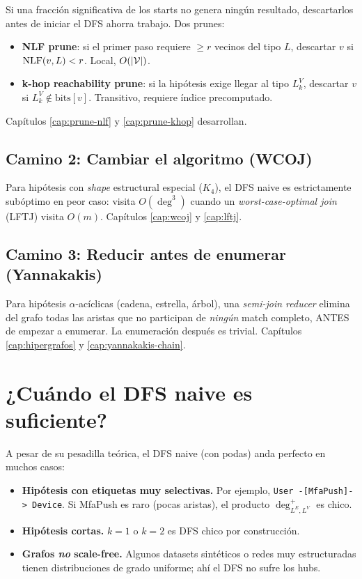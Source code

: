 Si una fracción significativa de los starts no genera ningún
resultado, descartarlos antes de iniciar el DFS ahorra trabajo.
Dos prunes:

\begin{itemize}
    \item \textbf{NLF prune}: si el primer paso requiere
    \(\geq r\) vecinos del tipo \(L\), descartar \(v\) si
    \(\mathrm{NLF}(v, L) < r\). Local, \(O(|\mathcal{V}|)\).
    \item \textbf{k-hop reachability prune}: si la hipótesis exige
    llegar al tipo \(L_k^V\), descartar \(v\) si \(L_k^V \notin
    \mathrm{bits}[v]\). Transitivo, requiere índice precomputado.
\end{itemize}

Capítulos \ref{cap:prune-nlf} y \ref{cap:prune-khop} desarrollan.

\subsection{Camino 2: Cambiar el algoritmo (WCOJ)}

Para hipótesis con \emph{shape} estructural especial (\(K_4\)), el
DFS naive es estrictamente subóptimo en peor caso: visita
\(O(\deg^3)\) cuando un \emph{worst-case-optimal join} (LFTJ)
visita \(O(m)\). Capítulos \ref{cap:wcoj} y \ref{cap:lftj}.

\subsection{Camino 3: Reducir antes de enumerar (Yannakakis)}

Para hipótesis \(\alpha\)-acíclicas (cadena, estrella, árbol), una
\emph{semi-join reducer} elimina del grafo todas las aristas que
no participan de \emph{ningún} match completo, ANTES de empezar a
enumerar. La enumeración después es trivial. Capítulos
\ref{cap:hipergrafos} y \ref{cap:yannakakis-chain}.

\section{¿Cuándo el DFS naive es suficiente?}

A pesar de su pesadilla teórica, el DFS naive (con podas) anda
perfecto en muchos casos:

\begin{itemize}
    \item \textbf{Hipótesis con etiquetas muy selectivas.} Por
    ejemplo, \texttt{User -[MfaPush]-> Device}. Si MfaPush es raro
    (pocas aristas), el producto \(\deg^{+}_{L^E,L^V}\) es chico.
    \item \textbf{Hipótesis cortas.} \(k = 1\) o \(k = 2\) es DFS
    chico por construcción.
    \item \textbf{Grafos \emph{no} scale-free.} Algunos datasets
    sintéticos o redes muy estructuradas tienen distribuciones de
    grado uniforme; ahí el DFS no sufre los hubs.
\end{itemize}

